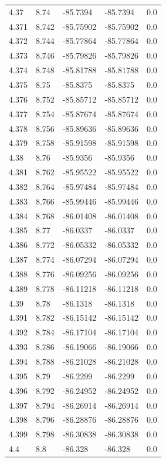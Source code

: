 \begin{tabular}{lllll}
4.37 & 8.74 & -85.7394 & -85.7394 & 0.0 \\
4.371 & 8.742 & -85.75902 & -85.75902 & 0.0 \\
4.372 & 8.744 & -85.77864 & -85.77864 & 0.0 \\
4.373 & 8.746 & -85.79826 & -85.79826 & 0.0 \\
4.374 & 8.748 & -85.81788 & -85.81788 & 0.0 \\
4.375 & 8.75 & -85.8375 & -85.8375 & 0.0 \\
4.376 & 8.752 & -85.85712 & -85.85712 & 0.0 \\
4.377 & 8.754 & -85.87674 & -85.87674 & 0.0 \\
4.378 & 8.756 & -85.89636 & -85.89636 & 0.0 \\
4.379 & 8.758 & -85.91598 & -85.91598 & 0.0 \\
4.38 & 8.76 & -85.9356 & -85.9356 & 0.0 \\
4.381 & 8.762 & -85.95522 & -85.95522 & 0.0 \\
4.382 & 8.764 & -85.97484 & -85.97484 & 0.0 \\
4.383 & 8.766 & -85.99446 & -85.99446 & 0.0 \\
4.384 & 8.768 & -86.01408 & -86.01408 & 0.0 \\
4.385 & 8.77 & -86.0337 & -86.0337 & 0.0 \\
4.386 & 8.772 & -86.05332 & -86.05332 & 0.0 \\
4.387 & 8.774 & -86.07294 & -86.07294 & 0.0 \\
4.388 & 8.776 & -86.09256 & -86.09256 & 0.0 \\
4.389 & 8.778 & -86.11218 & -86.11218 & 0.0 \\
4.39 & 8.78 & -86.1318 & -86.1318 & 0.0 \\
4.391 & 8.782 & -86.15142 & -86.15142 & 0.0 \\
4.392 & 8.784 & -86.17104 & -86.17104 & 0.0 \\
4.393 & 8.786 & -86.19066 & -86.19066 & 0.0 \\
4.394 & 8.788 & -86.21028 & -86.21028 & 0.0 \\
4.395 & 8.79 & -86.2299 & -86.2299 & 0.0 \\
4.396 & 8.792 & -86.24952 & -86.24952 & 0.0 \\
4.397 & 8.794 & -86.26914 & -86.26914 & 0.0 \\
4.398 & 8.796 & -86.28876 & -86.28876 & 0.0 \\
4.399 & 8.798 & -86.30838 & -86.30838 & 0.0 \\
4.4 & 8.8 & -86.328 & -86.328 & 0.0 \\

\end{tabular}
